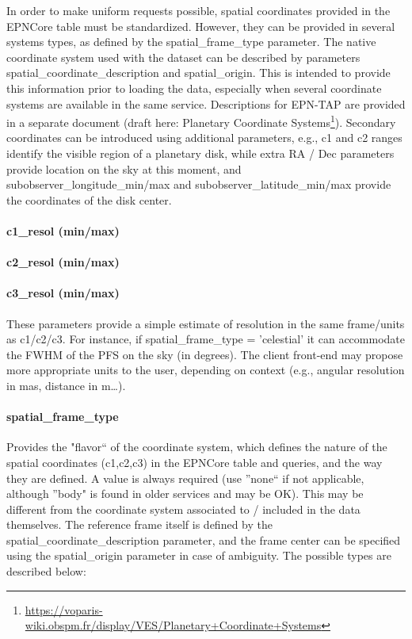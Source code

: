 \documentclass[11pt,a4paper]{ivoa}
\begin{document}
In order to make uniform requests possible, spatial coordinates provided in the EPNCore table must be standardized. However, they can be provided in several systems types, as defined by the spatial\_frame\_type parameter. The native coordinate system used with the dataset can be described by parameters spatial\_coordinate\_description and spatial\_origin. This is intended to provide this information prior to loading the data, especially when several coordinate systems are available in the same service. Descriptions for EPN-TAP are provided in a separate document (draft here: Planetary Coordinate Systems\footnote{\url{https://voparis-wiki.obspm.fr/display/VES/Planetary+Coordinate+Systems}}). Secondary coordinates can be introduced using additional parameters, e.g., c1 and c2 ranges identify the visible region of a planetary disk, while extra RA / Dec parameters provide location on the sky at this moment, and subobserver\_longitude\_min/max and subobserver\_latitude\_min/max provide the coordinates of the disk center.

\paragraph{c1\_resol (min/max)}

\paragraph{c2\_resol (min/max)}

\paragraph{c3\_resol (min/max)}

These parameters provide a simple estimate of resolution in the same frame/units as c1/c2/c3. For instance, if spatial\_frame\_type = 'celestial' it can accommodate the FWHM of the PFS on the sky (in degrees). The client front-end may propose more appropriate units to the user, depending on context (e.g., angular resolution in mas, distance in m…).

\paragraph{spatial\_frame\_type}

Provides the "flavor`` of the coordinate system, which defines the nature of the spatial coordinates (c1,c2,c3) in the EPNCore table and queries, and the way they are defined. A value is always required (use ''none`` if not applicable, although ''body" is found in older services and may be OK). This may be different from the coordinate system associated to / included in the data themselves. The reference frame itself is defined by the spatial\_coordinate\_description parameter, and the frame center can be specified using the spatial\_origin parameter in case of ambiguity. The possible types are described below:
\end{document}
